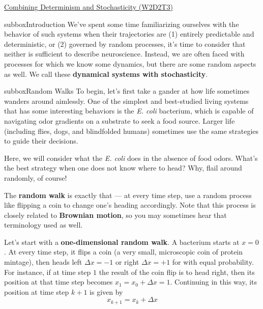\begin{textbox}{\href{https://compneuro.neuromatch.io/tutorials/W2D2_LinearSystems/student/W2D2_Tutorial3.html}{Combining Determinism and Stochasticity (W2D2T3)} }
\begin{subbox}{subbox}{Introduction}
\scriptsize
We've spent some time familiarizing ourselves with the behavior of such systems when their trajectories are (1) entirely predictable and deterministic, or (2) governed by random processes, it's time to consider that neither is sufficient to describe neuroscience. Instead, we are often faced with processes for which we know some dynamics, but there are some random aspects as well. We call these \textbf{dynamical systems with stochasticity}.

\end{subbox}
\begin{subbox}{subbox}{Random Walks}
\scriptsize
To begin, let's first take a gander at how life sometimes wanders around aimlessly. One of the simplest and best-studied living systems that has some interesting behaviors is the \textit{E. coli} bacterium, which is capable of navigating odor gradients on a substrate to seek a food source. Larger life (including flies, dogs, and blindfolded humans) sometimes use the same strategies to guide their decisions.

Here, we will consider what the \textit{E. coli} does in the absence of food odors. What's the best strategy when one does not know where to head? Why, flail around randomly, of course!

The \textbf{random walk} is exactly that --- at every time step, use a random process like flipping a coin to change one's heading accordingly. Note that this process is closely related to \textbf{Brownian motion}, so you may sometimes hear that terminology used as well.

Let's start with a \textbf{one-dimensional random walk}. A bacterium starts at $x=0$. At every time step, it flips a coin (a very small, microscopic coin of protein mintage), then heads left $\Delta x = -1$ or right $\Delta x = +1$ for with equal probability. For instance, if at time step $1$ the result of the coin flip is to head right, then its position at that time step becomes $x_1 = x_0 + \Delta x = 1.$ Continuing in this way, its position at time step $k+1$ is given by 
$$x_{k+1} = x_k + \Delta x $$    


\end{subbox}
\end{textbox}
